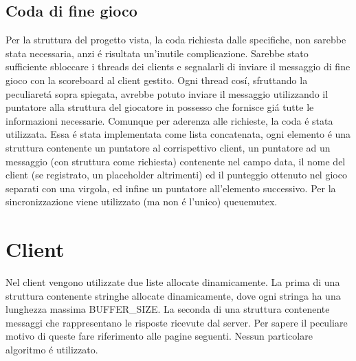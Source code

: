 \subsection{Coda di fine gioco}

Per la struttura del progetto vista, la coda richiesta dalle specifiche, non sarebbe stata necessaria, anzi \'e risultata un'inutile complicazione. Sarebbe stato sufficiente sbloccare i threads dei clients e segnalarli di inviare il messaggio di fine gioco con la scoreboard al client gestito. Ogni thread cos\'i, sfruttando la peculiaret\'a sopra spiegata, avrebbe potuto inviare il messaggio utilizzando il puntatore alla struttura del giocatore in possesso che fornisce gi\'a tutte le informazioni necessarie. Comunque per aderenza alle richieste, la coda \'e stata utilizzata. Essa \'e stata implementata come lista concatenata, ogni elemento \'e una struttura contenente un puntatore al corrispettivo client, un puntatore ad un messaggio (con struttura come richiesta) contenente nel campo data, il nome del client (se registrato, un placeholder altrimenti) ed il punteggio ottenuto nel gioco separati con una virgola, ed infine un puntatore all'elemento successivo. Per la sincronizzazione viene utilizzato (ma non \'e l'unico) queuemutex.
	
\section{Client}

Nel client vengono utilizzate due liste allocate dinamicamente. La prima di una struttura contenente stringhe allocate dinamicamente, dove ogni stringa ha una lunghezza massima BUFFER\_SIZE. La seconda di una struttura contenente messaggi che rappresentano le risposte ricevute dal server. Per sapere il peculiare motivo di queste fare riferimento alle pagine seguenti. Nessun particolare algoritmo \'e utilizzato.



